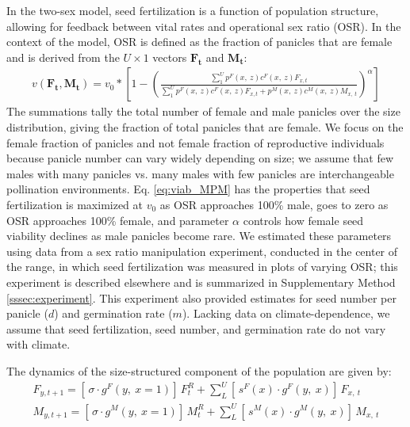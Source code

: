 \documentclass[12pt]{article}\usepackage[]{graphicx}\usepackage[dvipsnames]{xcolor}
\begin{document}
In the two-sex model, seed fertilization is a function of population structure, allowing for feedback between vital rates and operational sex ratio (OSR). 
In the context of the model, OSR is defined as the fraction of panicles that are female and is derived from the $U \times 1$ vectors $\mathbf{F_{t}}$ and $\mathbf{M_{t}}$:
\begin{align}\label{eq:viab_MPM}
	v(\mathbf{F_{t}},\mathbf{M_{t}}) = v_{0} * \left[ 1 - \left( \frac{\sum_{1}^{U} p^{F}(x,\ z) c^{F}(x,\ z) F_{x,t}}{\sum_{1}^{U} p^{F}(x,\ z) c^{F}(x,\ z) F_{x,t} + p^{M}(x,\ z) c^{M}(x,\ z) M_{x,\ t}} \right) ^{\alpha}\right]
\end{align}
The summations tally the total number of female and male panicles over the size distribution, giving the fraction of total panicles that are female. 
We focus on the female fraction of panicles and not female fraction of reproductive individuals because panicle number can vary widely depending on size; we assume that few males with many panicles vs. many males with few panicles are interchangeable pollination environments. 
Eq. \ref{eq:viab_MPM} has the properties that seed fertilization is maximized at $v_{0}$ as OSR approaches 100\% male, goes to zero as OSR approaches 100\% female, and parameter $\alpha$ controls how female seed viability declines as male panicles become rare. 
We estimated these parameters using data from a sex ratio manipulation experiment, conducted in the center of the range, in which seed fertilization was measured in plots of varying OSR; this experiment is described elsewhere  \citep{compagnoni2017can} and is summarized in Supplementary Method \ref{sssec:experiment}. 
This experiment also provided estimates for seed number per panicle ($d$) and germination rate ($m$). 
Lacking data on climate-dependence, we assume that seed fertilization, seed number, and germination rate do not vary with climate.  

The dynamics of the size-structured component of the population are given by:
\begin{align}\label{eq:dynamics}
F_{y,t+1} = [ \, \sigma \cdot g^{F}(y,\ x=1) ] \, F^{R}_{t} + \sum_{L}^{U} 	[ \, s^{F}(x) \cdot g^{F}(y,\ x)] \, F_{x,\ t}
\\
M_{y,t+1} = [ \, \sigma \cdot g^{M}(y,\ x=1) ] \, M^{R}_{t} + \sum_{L}^{U} 	[ \,  s^{M}(x) \cdot g^{M}(y,\ x) ] \, M_{x,\ t}
\end{align}
\end{document}
